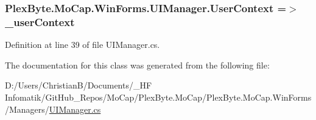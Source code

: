 \subsubsection[{\texorpdfstring{User\+Context}{UserContext}}]{ Plex\+Byte.\+Mo\+Cap.\+Win\+Forms.\+U\+I\+Manager.\+User\+Context =$>$ \+\_\+user\+Context}\hypertarget{class_plex_byte_1_1_mo_cap_1_1_win_forms_1_1_u_i_manager_a8df94d58920679d689826d4e0d63c684}{}\label{class_plex_byte_1_1_mo_cap_1_1_win_forms_1_1_u_i_manager_a8df94d58920679d689826d4e0d63c684}


Definition at line 39 of file U\+I\+Manager.\+cs.



The documentation for this class was generated from the following file\+:\begin{DoxyCompactItemize}
\item 
D\+:/\+Users/\+Christian\+B/\+Documents/\+\_\+\+H\+F Infomatik/\+Git\+Hub\+\_\+\+Repos/\+Mo\+Cap/\+Plex\+Byte.\+Mo\+Cap/\+Plex\+Byte.\+Mo\+Cap.\+Win\+Forms/\+Managers/\hyperlink{_u_i_manager_8cs}{U\+I\+Manager.\+cs}\end{DoxyCompactItemize}
